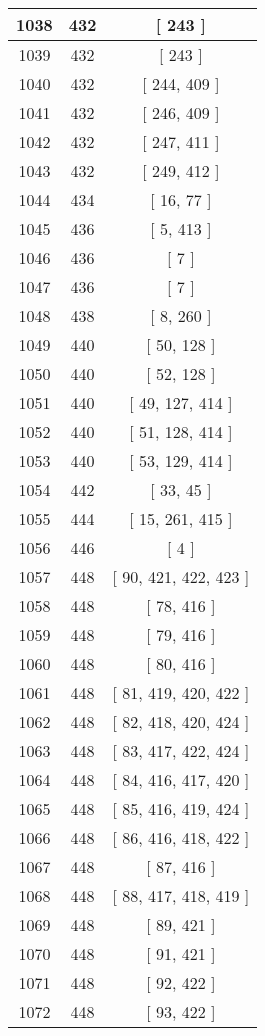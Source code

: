 \begin{center}
\begin{longtable}[H]{|| c c c ||}
1038 & 432 & [ 243 ]
\\\hline
1039 & 432 & [ 243 ]
\\\hline
1040 & 432 & [ 244, 409 ]
\\\hline
1041 & 432 & [ 246, 409 ]
\\\hline
1042 & 432 & [ 247, 411 ]
\\\hline
1043 & 432 & [ 249, 412 ]
\\\hline
1044 & 434 & [ 16, 77 ]
\\\hline
1045 & 436 & [ 5, 413 ]
\\\hline
1046 & 436 & [ 7 ]
\\\hline
1047 & 436 & [ 7 ]
\\\hline
1048 & 438 & [ 8, 260 ]
\\\hline
1049 & 440 & [ 50, 128 ]
\\\hline
1050 & 440 & [ 52, 128 ]
\\\hline
1051 & 440 & [ 49, 127, 414 ]
\\\hline
1052 & 440 & [ 51, 128, 414 ]
\\\hline
1053 & 440 & [ 53, 129, 414 ]
\\\hline
1054 & 442 & [ 33, 45 ]
\\\hline
1055 & 444 & [ 15, 261, 415 ]
\\\hline
1056 & 446 & [ 4 ]
\\\hline
1057 & 448 & [ 90, 421, 422, 423 ]
\\\hline
1058 & 448 & [ 78, 416 ]
\\\hline
1059 & 448 & [ 79, 416 ]
\\\hline
1060 & 448 & [ 80, 416 ]
\\\hline
1061 & 448 & [ 81, 419, 420, 422 ]
\\\hline
1062 & 448 & [ 82, 418, 420, 424 ]
\\\hline
1063 & 448 & [ 83, 417, 422, 424 ]
\\\hline
1064 & 448 & [ 84, 416, 417, 420 ]
\\\hline
1065 & 448 & [ 85, 416, 419, 424 ]
\\\hline
1066 & 448 & [ 86, 416, 418, 422 ]
\\\hline
1067 & 448 & [ 87, 416 ]
\\\hline
1068 & 448 & [ 88, 417, 418, 419 ]
\\\hline
1069 & 448 & [ 89, 421 ]
\\\hline
1070 & 448 & [ 91, 421 ]
\\\hline
1071 & 448 & [ 92, 422 ]
\\\hline
1072 & 448 & [ 93, 422 ]

\end{longtable}
\end{center}
